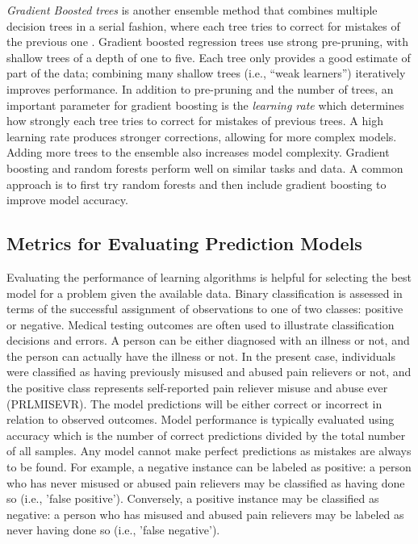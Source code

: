 \documentclass[sigconf]{acmart}
\begin{document}

\emph{Gradient Boosted trees} is another ensemble method that combines 
multiple decision trees in a serial fashion, where each tree tries to correct 
for mistakes of the previous one \cite{muller17}. Gradient boosted regression 
trees use strong pre-pruning, with shallow trees of a depth of one to five. 
Each tree only provides a good estimate of part of the data; combining many 
shallow trees (i.e., ``weak learners'') iteratively improves performance. 
In addition to pre-pruning and the number of trees, an important parameter 
for gradient boosting is the \emph{learning rate} which determines how strongly 
each tree tries to correct for mistakes of previous trees. A high learning rate
produces stronger corrections, allowing for more complex models. Adding more 
trees to the ensemble also increases model complexity. Gradient boosting
and random forests perform well on similar tasks and data. A common 
approach is to first try random forests and then include gradient boosting 
to improve model accuracy. 


\subsection{Metrics for Evaluating Prediction Models}

Evaluating the performance of learning algorithms is helpful for selecting 
the best model for a problem given the available data. Binary classification 
is assessed in terms of the successful assignment of observations to one of 
two classes: positive or negative. Medical testing outcomes are often used to 
illustrate classification decisions and errors. A person can be either 
diagnosed with an illness or not, and the person can actually have the 
illness or not. In the present case, individuals were classified as having 
previously misused and abused pain relievers or not, and the positive class
represents self-reported pain reliever misuse and abuse ever (PRLMISEVR).
The model predictions will be either correct or incorrect in relation to
observed outcomes. Model performance is typically evaluated using accuracy 
which is the number of correct predictions divided by the total number of 
all samples. Any model cannot make perfect predictions as mistakes are 
always to be found. For example, a negative instance can be labeled 
as positive: a person who has never misused or abused pain relievers may be 
classified as having done so (i.e., 'false positive'). Conversely, a positive 
instance may be classified as negative: a person who has misused and abused 
pain relievers may be labeled as never having done so (i.e., 'false negative').
\end{document}

